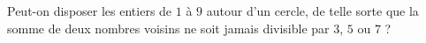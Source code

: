 Peut-on disposer les entiers de $1$ à $9$ autour d'un cercle, de telle sorte que la somme de deux nombres voisins ne soit jamais divisible par $3$, $5$ ou $7$ ?
